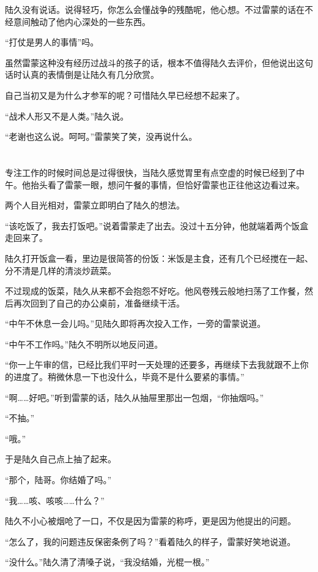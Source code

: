 陆久没有说话。说得轻巧，你怎么会懂战争的残酷呢，他心想。不过雷蒙的话在不经意间触动了他内心深处的一些东西。

“打仗是男人的事情”吗。

虽然雷蒙这种没有经历过战斗的孩子的话，根本不值得陆久去评价，但他说出这句话时认真的表情倒是让陆久有几分欣赏。

自己当初又是为什么才参军的呢？可惜陆久早已经想不起来了。

“战术人形又不是人类。”陆久说。

“老谢也这么说。呵呵。”雷蒙笑了笑，没再说什么。



\section*{}

专注工作的时候时间总是过得很快，当陆久感觉胃里有点空虚的时候已经到了中午。他抬头看了雷蒙一眼，想问午餐的事情，但恰好雷蒙也正往他这边看过来。

两个人目光相对，雷蒙立即明白了陆久的想法。

“该吃饭了，我去打饭吧。”说着雷蒙走了出去。没过十五分钟，他就端着两个饭盒走回来了。

陆久打开饭盒一看，里边是很简答的份饭：米饭是主食，还有几个已经搅在一起、分不清是几样的清淡炒蔬菜。

不过现成的饭菜，陆久从来都不会抱怨不好吃。他风卷残云般地扫荡了工作餐，然后再次回到了自己的办公桌前，准备继续干活。

“中午不休息一会儿吗。”见陆久即将再次投入工作，一旁的雷蒙说道。

“中午不工作吗。”陆久不明所以地反问道。

“你一上午审的信，已经比我们平时一天处理的还要多，再继续下去我就跟不上你的进度了。稍微休息一下也没什么，毕竟不是什么要紧的事情。”

“啊……好吧。”听到雷蒙的话，陆久从抽屉里那出一包烟，“你抽烟吗。”

“不抽。”

“哦。”

于是陆久自己点上抽了起来。

“那个，陆哥。你结婚了吗。”

“我……咳、咳咳……什么？”

陆久不小心被烟呛了一口，不仅是因为雷蒙的称呼，更是因为他提出的问题。

“怎么了，我的问题违反保密条例了吗？”看着陆久的样子，雷蒙好笑地说道。

“没什么。”陆久清了清嗓子说，“我没结婚，光棍一根。”

